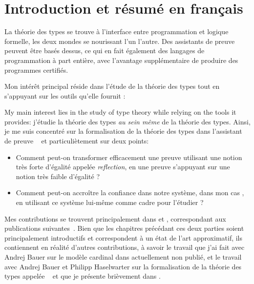 \chapter{Introduction et résumé en français}



La théorie des types se trouve à l'interface entre programmation et logique
formelle, les deux mondes se nourissant l'un l'autre. Des assistants de preuve
peuvent être basés dessus, ce qui en fait également des langages de
programmation à part entière, avec l'avantage supplémentaire de produire des
programmes certifiés.

Mon intérêt principal réside dans l'étude de la théorie des types tout en s'appuyant sur les outils qu'elle fournit :

My main interest lies in the study of type theory while relying on the tools it
provides: j'étudie la théorie des types \emph{au sein même} de la théorie des
types.
Ainsi, je me suis concentré sur la formalisation de la théorie des types dans
l'assistant de preuve \Coq~ et particuliètement sur
deux points:
\begin{itemize}
  \item Comment peut-on transformer efficacement une preuve utilisant une notion
  très forte d'égalité appelée \emph{reflection}, en une preuve s'appuyant sur
  une notion très faible d'égalité ?
  \item Comment peut-on accroître la confiance dans notre système, dans mon
  cas \Coq, en utilisant ce système lui-même comme cadre pour l'étudier ?
\end{itemize}

Mes contributions se trouvent principalement dans 
et , correspondant aux publications
suivantes~.
Bien que les chapitres précédant ces deux parties soient principalement
introductifs et correspondent à un état de l'art approximatif, ils contiennent
en réalité d'autres contributions, à savoir le travail que j'ai fait avec Andrej
Bauer sur le modèle cardinal dans  actuellement non publié, et le travail avec Andrej Bauer et Philipp Haselwarter sur la formalisation de la
théorie des types appelée \ftt~ et que je
présente brièvement dans .

